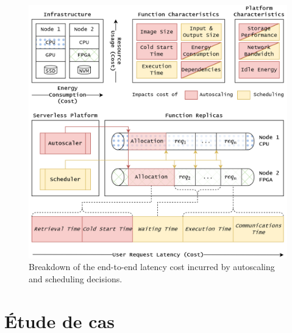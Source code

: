 

\begin{figure}[t]
    \centering
    \includegraphics[width=\columnwidth]{7_Chapitre5/figures/serverless-cost.png}
    \caption{Breakdown of the end-to-end latency cost incurred by autoscaling and scheduling decisions.}
\label{figure:herosim-cost}
\end{figure}

\section{Étude de cas}
\label{section:herosim-case-study}


